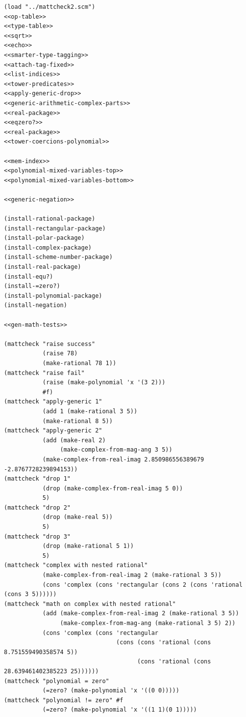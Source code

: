 \documentclass[final,fleqn,titlepage,twoside]{article}
\begin{document}
\begin{verbatim}
(load "../mattcheck2.scm")
<<op-table>>
<<type-table>>
<<sqrt>>
<<echo>>
<<smarter-type-tagging>>
<<attach-tag-fixed>>
<<list-indices>>
<<tower-predicates>>
<<apply-generic-drop>>
<<generic-arithmetic-complex-parts>>
<<real-package>>
<<eqzero?>>
<<real-package>>
<<tower-coercions-polynomial>>

<<mem-index>>
<<polynomial-mixed-variables-top>>
<<polynomial-mixed-variables-bottom>>

<<generic-negation>>

(install-rational-package)
(install-rectangular-package)
(install-polar-package)
(install-complex-package)
(install-scheme-number-package)
(install-real-package)
(install-equ?)
(install-=zero?)
(install-polynomial-package)
(install-negation)

<<gen-math-tests>>

(mattcheck "raise success"
           (raise 78)
           (make-rational 78 1))
(mattcheck "raise fail"
           (raise (make-polynomial 'x '(3 2)))
           #f)
(mattcheck "apply-generic 1"
           (add 1 (make-rational 3 5))
           (make-rational 8 5))
(mattcheck "apply-generic 2"
           (add (make-real 2)
                (make-complex-from-mag-ang 3 5))
           (make-complex-from-real-imag 2.850986556389679 -2.8767728239894153))
(mattcheck "drop 1"
           (drop (make-complex-from-real-imag 5 0))
           5)
(mattcheck "drop 2"
           (drop (make-real 5))
           5)
(mattcheck "drop 3"
           (drop (make-rational 5 1))
           5)
(mattcheck "complex with nested rational"
           (make-complex-from-real-imag 2 (make-rational 3 5))
           (cons 'complex (cons 'rectangular (cons 2 (cons 'rational (cons 3 5))))))
(mattcheck "math on complex with nested rational"
           (add (make-complex-from-real-imag 2 (make-rational 3 5))
                (make-complex-from-mag-ang (make-rational 3 5) 2))
           (cons 'complex (cons 'rectangular
                                (cons (cons 'rational (cons 8.751559490358574 5))
                                      (cons 'rational (cons 28.639461402385223 25))))))
(mattcheck "polynomial = zero"
           (=zero? (make-polynomial 'x '((0 0)))))
(mattcheck "polynomial != zero" #f
           (=zero? (make-polynomial 'x '((1 1)(0 1)))))


\end{verbatim}
\end{document}
